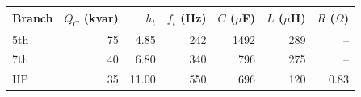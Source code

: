 \begin{tabular}{lrrrrrr}
\toprule
Branch & $Q_C$ (kvar) & $h_t$ & $f_t$ (Hz) & $C$ ($\mu$F) & $L$ ($\mu$H) & $R$ ($\Omega$)\\
\midrule
5th & 75 & 4.85 & 242 & 1492 & 289 & --\\
7th & 40 & 6.80 & 340 & 796 & 275 & --\\
HP & 35 & 11.00 & 550 & 696 & 120 & 0.83\\
\bottomrule
\end{tabular}
